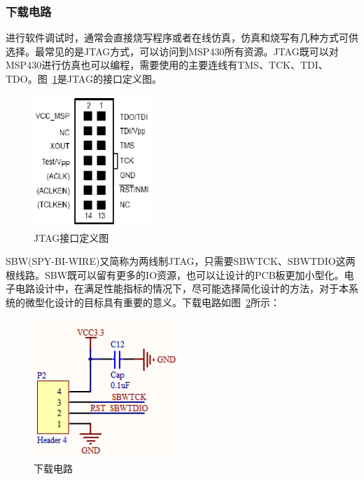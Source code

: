 \subsubsection{下载电路} 
进行软件调试时，通常会直接烧写程序或者在线仿真，仿真和烧写有几种方式可供选择。最常见的是JTAG方式，可以访问到MSP430所有资源。JTAG既可以对MSP430进行仿真也可以编程，需要使用的主要连线有TMS、TCK、TDI、TDO。图~\ref{fig:JTAG接口定义图}是JTAG的接口定义图。

\begin{figure}[ht]
    \centering
	\includegraphics[width=0.4\textwidth]{fig/JTAG接口定义图.png}
	\caption{JTAG接口定义图}
	\label{fig:JTAG接口定义图}
\end{figure}


SBW(SPY-BI-WIRE)又简称为两线制JTAG，只需要SBWTCK、SBWTDIO这两根线路。SBW既可以留有更多的IO资源，也可以让设计的PCB板更加小型化。电子电路设计中，在满足性能指标的情况下，尽可能选择简化设计的方法，对于本系统的微型化设计的目标具有重要的意义。下载电路如图~\ref{fig:下载电路}所示：

\begin{figure}[ht]
    \centering
	\includegraphics[width=0.5\textwidth]{fig/下载电路.png}
	\caption{下载电路}
	\label{fig:下载电路}
\end{figure}

